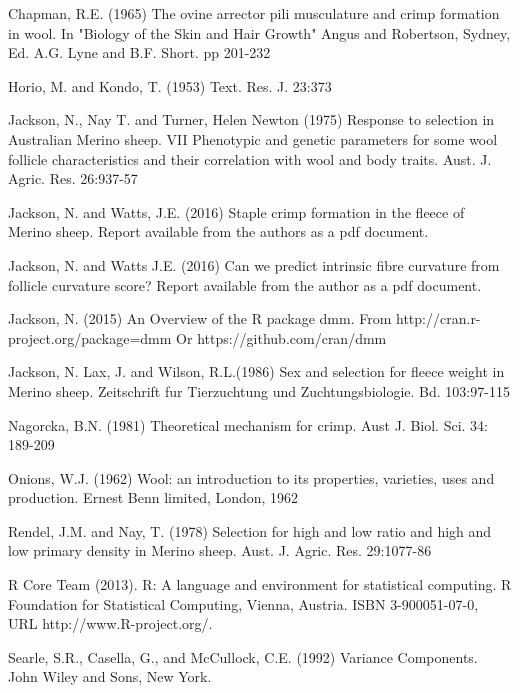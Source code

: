 \documentclass[titlepage]{article}  %
\begin{document}
\begin{thebibliography}{99}

Chapman, R.E. (1965) The ovine arrector pili musculature and crimp formation 
    in wool. In "Biology of the Skin and Hair Growth" Angus and Robertson,
    Sydney, Ed. A.G. Lyne and B.F. Short. pp 201-232

Horio, M. and Kondo, T. (1953) Text. Res. J. 23:373

Jackson, N., Nay T. and Turner, Helen Newton (1975) Response to selection
    in Australian Merino sheep. VII Phenotypic and genetic parameters for
    some wool follicle characteristics and their correlation with wool and
    body traits. Aust. J. Agric. Res. 26:937-57

Jackson, N. and Watts, J.E. (2016) Staple crimp formation in the fleece of Merino sheep. 
Report available from the authors as a pdf document.

Jackson, N.  and Watts J.E. (2016) Can we predict intrinsic fibre curvature from follicle curvature score? Report available from the author as a pdf document.

Jackson, N. (2015) An Overview of the R package dmm.
    From http://cran.r-project.org/package=dmm
    Or https://github.com/cran/dmm

Jackson, N. Lax, J. and Wilson, R.L.(1986) Sex and selection for fleece weight in Merino sheep. Zeitschrift fur Tierzuchtung und Zuchtungsbiologie. Bd. 103:97-115

Nagorcka, B.N. (1981) Theoretical mechanism for crimp.
     Aust J. Biol. Sci. 34: 189-209

Onions, W.J. (1962) Wool: an introduction to its properties, varieties, uses
     and production. Ernest Benn limited, London, 1962

Rendel, J.M. and Nay, T. (1978) Selection for high and low ratio and high 
    and low primary density in Merino sheep. 
    Aust. J. Agric. Res. 29:1077-86

R Core Team (2013). R: A language and environment for statistical
  computing. R Foundation for Statistical Computing, Vienna, Austria.
  ISBN 3-900051-07-0, URL http://www.R-project.org/.

Searle, S.R., Casella, G., and McCullock, C.E. (1992) Variance Components.
    John Wiley and Sons, New York.



\end{thebibliography}
\end{document}
